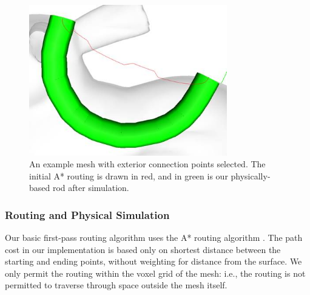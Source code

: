 \begin{figure}[h!]
\centering
    \includegraphics[width=3.4in]{figures/placeholder/exterior.jpg}
\caption{An example mesh with exterior connection points selected.  The initial A* routing is drawn in {\color{red}red}, and in {\color{tovi}green} is our physically-based rod after simulation. }
\label{fig:tool-process-exterior}
\end{figure}

\subsubsection{Routing and Physical Simulation}

Our basic first-pass routing algorithm uses the A* routing algorithm \cite{Hart-Astar}.  The path cost in our implementation is based only on shortest distance between the starting and ending points, without weighting for distance from the surface.  We only permit the routing within the voxel grid of the mesh: i.e., the routing is not permitted to traverse through space outside the mesh itself.

